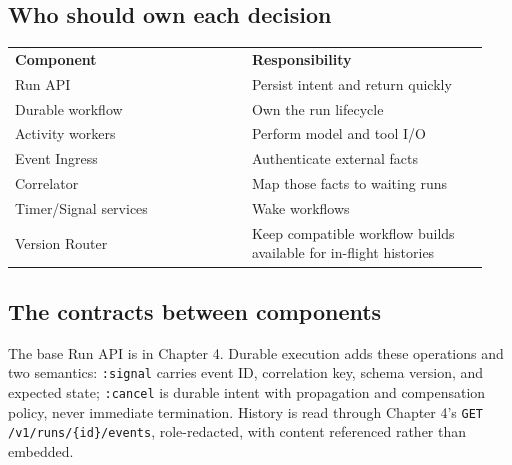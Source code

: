 \subsection{Who should own each decision}

\BookTableStart
\small
\begin{tabular}{@{}Y{0.4700\linewidth}Y{0.4700\linewidth}@{}}
\color{white}\bfseries \textbf{Component} & \color{white}\bfseries \textbf{Responsibility} \\
Run API & Persist intent and return quickly \\
Durable workflow & Own the run lifecycle \\
Activity workers & Perform model and tool I/O \\
Event Ingress & Authenticate external facts \\
Correlator & Map those facts to waiting runs \\
Timer/Signal services & Wake workflows \\
Version Router & Keep compatible workflow builds available for in-flight histories \\
\end{tabular}
\BookTableEnd

\subsection{The contracts between components}

The base Run API is in Chapter 4. Durable execution adds these operations and two semantics: \lstinline[style=bookinline]!:signal! carries event ID, correlation key, schema version, and expected state; \lstinline[style=bookinline]!:cancel! is durable intent with propagation and compensation policy, never immediate termination. History is read through Chapter 4's \lstinline[style=bookinline]!GET /v1/runs/{id}/events!, role-redacted, with content referenced rather than embedded.\par

